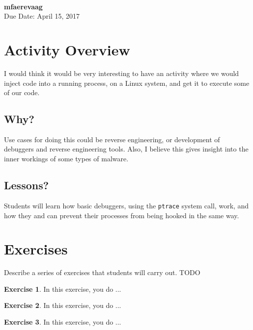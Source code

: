 \documentclass[a4paper, 11pt]{article}
\theoremstyle{definition}
\newtheorem{exercise}{Exercise}
\begin{document}
 \\
         {\phantom{} \hfill \textbf{mfaerevaag}} \\
         {\phantom{} \hfill Due Date: April 15, 2017} \\

\section{Activity Overview}

I would think it would be very interesting to have an activity where
we would inject code into a running process, on a Linux system, and
get it to execute some of our code.

\subsection{Why?}

Use cases for doing this could be reverse engineering, or development
of debuggers and reverse engineering tools. Also, I believe this gives
insight into the inner workings of some types of malware.

\subsection{Lessons?}

Students will learn how basic debuggers, using the {\tt ptrace} system
call, work, and how they and can prevent their processes from being
hooked in the same way.

\section{Exercises}

Describe a series of exercises that students will carry out. TODO

\begin{exercise}

  In this exercise, you do ...

\end{exercise}

\begin{exercise}

  In this exercise, you do ...

\end{exercise}

\begin{exercise}

  In this exercise, you do ...

\end{exercise}
\end{document}
